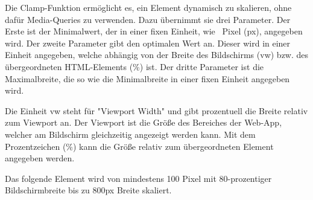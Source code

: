 \label{sec:clamp}

Die Clamp-Funktion ermöglicht es, ein Element dynamisch zu skalieren, ohne dafür Media-Queries zu verwenden. 
Dazu übernimmt sie drei Parameter. 
Der Erste ist der Minimalwert, der in einer fixen Einheit, wie \zb\ Pixel ({\ttfamily px}), angegeben wird. 
Der zweite Parameter gibt den optimalen Wert an. 
Dieser wird in einer Einheit angegeben, welche abhängig von der Breite des Bildschirms ({\ttfamily vw}) bzw. des übergeordneten HTML-Elements ({\ttfamily \%}) ist. 
Der dritte Parameter ist die Maximalbreite, die so wie die Minimalbreite in einer fixen Einheit angegeben wird. 

Die Einheit {\ttfamily vw} steht für "Viewport Width" und gibt prozentuell die Breite relativ zum Viewport an. Der Viewport ist die Größe des Bereiches der Web-App, welcher am Bildschirm gleichzeitig angezeigt werden kann. 
Mit dem Prozentzeichen ({\ttfamily \%}) kann die Größe relativ zum übergeordneten Element angegeben werden.

Das folgende Element wird von mindestens 100 Pixel mit 80-prozentiger Bildschirmbreite bis zu 800px Breite skaliert.

